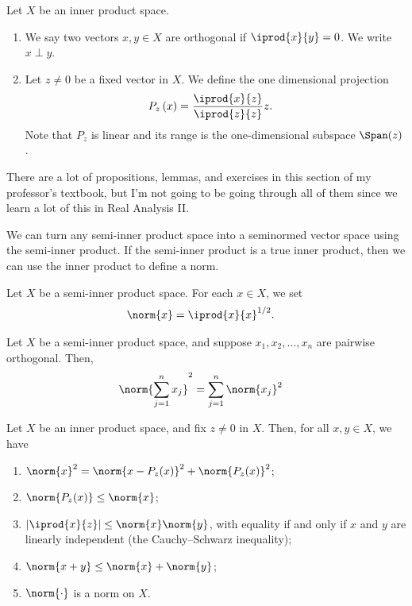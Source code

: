 \documentclass[10pt]{mypackage}
\begin{document}
\begin{definition}
  Let $X$ be an inner product space.
  \begin{enumerate}[(1)]
    \item We say two vectors $x,y\in X$ are orthogonal if $ \iprod{x}{y} = 0 $. We write $x\perp y$.
    \item Let $z\neq 0$ be a fixed vector in $X$. We define the one dimensional projection
      \begin{align*}
        P_{z}\left(x\right) &= \frac{ \iprod{x}{z} }{ \iprod{z}{z} } z.
      \end{align*}
      Note that $P_{z}$ is linear and its range is the one-dimensional subspace $\Span(z)$.
  \end{enumerate}
\end{definition}
\begin{note}
There are a lot of propositions, lemmas, and exercises in this section of my professor's textbook, but I'm not going to be going through all of them since we learn a lot of this in Real Analysis II.
\end{note}
We can turn any semi-inner product space into a seminormed vector space using the semi-inner product. If the semi-inner product is a true inner product, then we can use the inner product to define a norm.
\begin{definition}
  Let $X$ be a semi-inner product space. For each $x\in X$, we set
  \begin{align*}
    \norm{x} &= \iprod{x}{x}^{1/2}.
  \end{align*}
\end{definition}
\begin{theorem}[Pythagoras]
  Let $X$ be a semi-inner product space, and suppose $x_1,x_2,\dots,x_n$ are pairwise orthogonal. Then,
  \begin{align*}
    \norm{\sum_{j=1}^{n}x_j}^2 &= \sum_{j=1}^{n}\norm{x_j}^2
  \end{align*}
\end{theorem}
\begin{corollary}
  Let $X$ be an inner product space, and fix $z\neq 0$ in $X$. Then, for all $x,y\in X$, we have
  \begin{enumerate}[(1)]
    \item $\norm{x}^2 = \norm{x-P_z(x)}^2 + \norm{P_z(x)}^2$;
    \item $\norm{P_z(x)} \leq \norm{x}$;
    \item $\left\vert \iprod{x}{z} \right\vert \leq \norm{x}\norm{y}$, with equality if and only if $x$ and $y$ are linearly independent (the Cauchy--Schwarz inequality);
    \item $\norm{x + y} \leq \norm{x} + \norm{y}$;
    \item $\norm{\cdot}$ is a norm on $X$.
  \end{enumerate}
\end{corollary}
\end{document}
